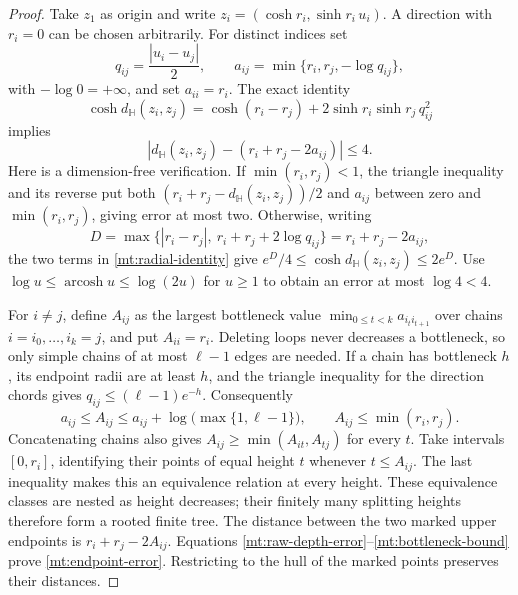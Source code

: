 \begin{proof}
Take \(z_1\) as origin and write
\(z_i=(\cosh r_i,\sinh r_i\,u_i)\).  A direction with \(r_i=0\)
can be chosen arbitrarily.  For distinct indices set
\[
 q_{ij}=\frac{|u_i-u_j|}{2},\qquad
 a_{ij}=\min\{r_i,r_j,-\log q_{ij}\},
\]
with \(-\log0=+\infty\), and set \(a_{ii}=r_i\).  The exact identity
\begin{equation}\label{mt:radial-identity}
 \cosh d_{\mathbb H}(z_i,z_j)
 =\cosh(r_i-r_j)+2\sinh r_i\sinh r_j\,q_{ij}^2
\end{equation}
implies
\begin{equation}\label{mt:raw-depth-error}
 \left|d_{\mathbb H}(z_i,z_j)-(r_i+r_j-2a_{ij})\right|\le4.
\end{equation}
Here is a dimension-free verification.  If \(\min(r_i,r_j)<1\),
the triangle inequality and its reverse put both
\((r_i+r_j-d_{\mathbb H}(z_i,z_j))/2\) and \(a_{ij}\) between zero
and \(\min(r_i,r_j)\), giving error at most two.  Otherwise, writing
\[
 D=\max\{|r_i-r_j|,\ r_i+r_j+2\log q_{ij}\}
   =r_i+r_j-2a_{ij},
\]
the two terms in \eqref{mt:radial-identity} give
\(e^D/4\le\cosh d_{\mathbb H}(z_i,z_j)\le2e^D\).
Use \(\log u\le\operatorname{arcosh}u\le\log(2u)\) for \(u\ge1\)
to obtain an error at most \(\log4<4\).

For \(i\ne j\), define \(A_{ij}\) as the largest bottleneck value
\(\min_{0\le t<k}a_{i_ti_{t+1}}\) over chains
\(i=i_0,\ldots,i_k=j\), and put \(A_{ii}=r_i\).
Deleting loops never decreases a bottleneck, so only simple chains
of at most \(\ell-1\) edges are needed.  If a chain has bottleneck \(h\),
its endpoint radii are at least \(h\), and the triangle inequality
for the direction chords gives
\(q_{ij}\le(\ell-1)e^{-h}\).  Consequently
\begin{equation}\label{mt:bottleneck-bound}
 a_{ij}\le A_{ij}
 \le a_{ij}+\log\bigl(\max\{1,\ell-1\}\bigr),\qquad
 A_{ij}\le\min(r_i,r_j).
\end{equation}
Concatenating chains also gives
\(A_{ij}\ge\min(A_{it},A_{tj})\) for every \(t\).
Take intervals \([0,r_i]\), identifying their points of equal height
\(t\) whenever \(t\le A_{ij}\).  The last inequality makes this an
equivalence relation at every height.  These equivalence classes are
nested as height decreases; their finitely many splitting heights
therefore form a rooted finite tree.  The distance between the two
marked upper endpoints is
\(r_i+r_j-2A_{ij}\).  Equations
\eqref{mt:raw-depth-error}--\eqref{mt:bottleneck-bound} prove
\eqref{mt:endpoint-error}.  Restricting to the hull of the marked
points preserves their distances.
\end{proof}

